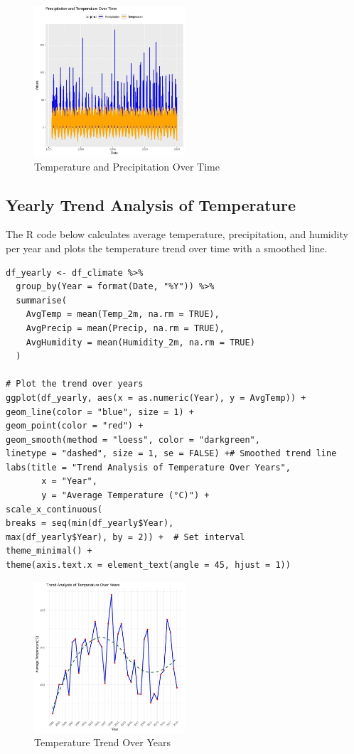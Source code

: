 \begin{figure}[h]
\centering
\includegraphics[width=0.5\textwidth]{figures/temp_precipt.jpg}
\caption{Temperature and Precipitation Over Time}
\end{figure}

\subsection*{Yearly Trend Analysis of Temperature}

The R code below calculates average temperature, precipitation, and humidity per year and plots the temperature trend over time with a smoothed line.

\begin{verbatim}
df_yearly <- df_climate %>%
  group_by(Year = format(Date, "%Y")) %>%
  summarise(
    AvgTemp = mean(Temp_2m, na.rm = TRUE),
    AvgPrecip = mean(Precip, na.rm = TRUE),
    AvgHumidity = mean(Humidity_2m, na.rm = TRUE)
  )

# Plot the trend over years
ggplot(df_yearly, aes(x = as.numeric(Year), y = AvgTemp)) +
geom_line(color = "blue", size = 1) + 
geom_point(color = "red") +  
geom_smooth(method = "loess", color = "darkgreen", 
linetype = "dashed", size = 1, se = FALSE) +# Smoothed trend line
labs(title = "Trend Analysis of Temperature Over Years",
       x = "Year",
       y = "Average Temperature (°C)") +
scale_x_continuous(
breaks = seq(min(df_yearly$Year),
max(df_yearly$Year), by = 2)) +  # Set interval
theme_minimal() +
theme(axis.text.x = element_text(angle = 45, hjust = 1))
\end{verbatim}

\begin{figure}[h]
\centering
\includegraphics[width=0.5\textwidth]{figures/temp_trend.jpg}
\caption{Temperature Trend Over Years}
\end{figure}

